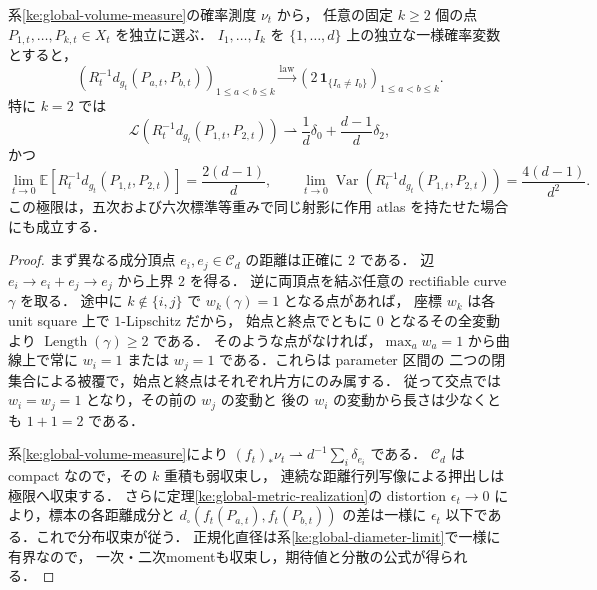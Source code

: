 \begin{corollary}[確率 KE 体積からの有限標本距離行列]
\label{ke:random-ke-distance-matrix}
系\ref{ke:global-volume-measure}の確率測度 $\nu_t$ から，
任意の固定 $k\ge2$ 個の点 $P_{1,t},\ldots,P_{k,t}\in X_t$ を独立に選ぶ．
$I_1,\ldots,I_k$ を $\{1,\ldots,d\}$ 上の独立な一様確率変数とすると，
\begin{equation}\label{ke:eq:random-ke-distance-matrix}
 \left(R_t^{-1}d_{g_t}(P_{a,t},P_{b,t})\right)_{1\le a<b\le k}
 \xrightarrow{\mathrm{law}}
 \left(2\,\mathbf{1}_{\{I_a\ne I_b\}}\right)_{1\le a<b\le k}.
\end{equation}
特に $k=2$ では
\begin{equation}\label{ke:eq:random-ke-two-point-law}
 \mathcal L\left(R_t^{-1}d_{g_t}(P_{1,t},P_{2,t})\right)
 \rightharpoonup \frac1d\delta_0+\frac{d-1}{d}\delta_2,
\end{equation}
かつ
\[
 \lim_{t\to0}\mathbb E[R_t^{-1}d_{g_t}(P_{1,t},P_{2,t})]
 =\frac{2(d-1)}d,\qquad
 \lim_{t\to0}\operatorname{Var}\!\left(R_t^{-1}d_{g_t}(P_{1,t},P_{2,t})\right)
 =\frac{4(d-1)}{d^2}.
\]
この極限は，五次および六次標準等重みで同じ射影に作用 atlas
を持たせた場合にも成立する．
\end{corollary}

\begin{proof}
まず異なる成分頂点 $e_i,e_j\in\mathcal C_d$ の距離は正確に $2$ である．
辺 $e_i\to e_i+e_j\to e_j$ から上界 $2$ を得る．
逆に両頂点を結ぶ任意の rectifiable curve $\gamma$ を取る．
途中に $k\notin\{i,j\}$ で $w_k(\gamma)=1$ となる点があれば，
座標 $w_k$ は各 unit square 上で $1$-Lipschitz だから，
始点と終点でともに $0$ となるその全変動より
$\operatorname{Length}(\gamma)\ge2$ である．
そのような点がなければ，$\max_a w_a=1$ から曲線上で常に
$w_i=1$ または $w_j=1$ である．これらは parameter 区間の
二つの閉集合による被覆で，始点と終点はそれぞれ片方にのみ属する．
従って交点では $w_i=w_j=1$ となり，その前の $w_j$ の変動と
後の $w_i$ の変動から長さは少なくとも $1+1=2$ である．

系\ref{ke:global-volume-measure}により
$(f_t)_*\nu_t\rightharpoonup d^{-1}\sum_i\delta_{e_i}$ である．
$\mathcal C_d$ は compact なので，その $k$ 重積も弱収束し，
連続な距離行列写像による押出しは極限へ収束する．
さらに定理\ref{ke:global-metric-realization}の distortion
$\epsilon_t\to0$ により，標本の各距離成分と
$d_\square(f_t(P_{a,t}),f_t(P_{b,t}))$ の差は一様に
$\epsilon_t$ 以下である．これで分布収束が従う．
正規化直径は系\ref{ke:global-diameter-limit}で一様に有界なので，
一次・二次momentも収束し，期待値と分散の公式が得られる．
\end{proof}


